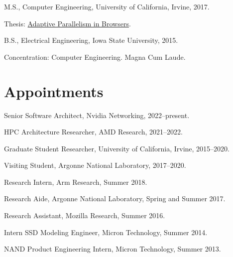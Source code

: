 \documentclass[11pt,article,oneside]{memoir}
\begin{document}
\ind M.S., Computer Engineering, University of California, Irvine, 2017. 

\ind \hspace{0.35in} \footnotesize Thesis: \href{https://escholarship.org/content/qt1044v4n3/qt1044v4n3.pdf}{Adaptive Parallelism in Browsers}.
\normalsize \vspace{0.05in}

\ind B.S., Electrical Engineering, Iowa State University, 2015.

\ind \hspace{0.35in} \footnotesize Concentration: Computer Engineering.
\newline Magna Cum Laude.
\normalsize

\bigskip

\section{Appointments}

{}

\ind Senior Software Architect, Nvidia Networking, 2022--present.
\vspace{0.01in}

\ind HPC Architecture Researcher, AMD Research, 2021--2022.
\vspace{0.01in}

\ind Graduate Student Researcher, University of California, Irvine, 2015--2020.
\vspace{0.01in}

\ind Visiting Student, Argonne National Laboratory, 2017--2020.
\vspace{0.01in}

\ind Research Intern, Arm Research, Summer 2018.
\vspace{0.01in}

\ind Research Aide, Argonne National Laboratory, Spring and Summer 2017.
\vspace{0.01in}
	
\ind Research Assistant, Mozilla Research, Summer 2016.

\bigskip

{}

\ind Intern SSD Modeling Engineer, Micron Technology, Summer 2014.
\vspace{0.01in}

\ind NAND Product Engineering Intern, Micron Technology, Summer 2013.
\vspace{0.01in}
\end{document}
